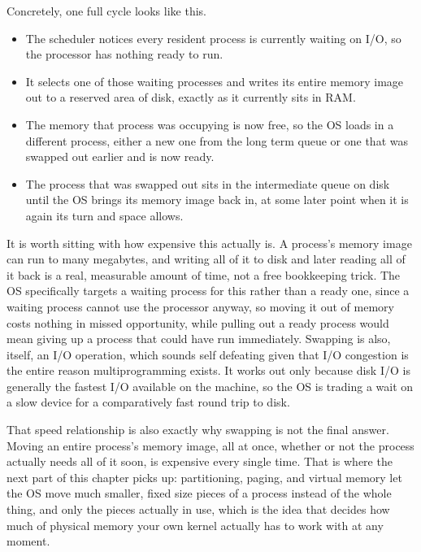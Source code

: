 \documentclass[11pt]{article}
\begin{document}
Concretely, one full cycle looks like this.

\begin{itemize}[leftmargin=1.4em]
  \item The scheduler notices every resident process is currently waiting on I/O, so the processor has nothing ready to run.
  \item It selects one of those waiting processes and writes its entire memory image out to a reserved area of disk, exactly as it currently sits in RAM.
  \item The memory that process was occupying is now free, so the OS loads in a different process, either a new one from the long term queue or one that was swapped out earlier and is now ready.
  \item The process that was swapped out sits in the intermediate queue on disk until the OS brings its memory image back in, at some later point when it is again its turn and space allows.
\end{itemize}

It is worth sitting with how expensive this actually is. A process's memory image can run to many megabytes, and writing all of it to disk and later reading all of it back is a real, measurable amount of time, not a free bookkeeping trick. The OS specifically targets a waiting process for this rather than a ready one, since a waiting process cannot use the processor anyway, so moving it out of memory costs nothing in missed opportunity, while pulling out a ready process would mean giving up a process that could have run immediately. Swapping is also, itself, an I/O operation, which sounds self defeating given that I/O congestion is the entire reason multiprogramming exists. It works out only because disk I/O is generally the fastest I/O available on the machine, so the OS is trading a wait on a slow device for a comparatively fast round trip to disk.

That speed relationship is also exactly why swapping is not the final answer. Moving an entire process's memory image, all at once, whether or not the process actually needs all of it soon, is expensive every single time. That is where the next part of this chapter picks up: partitioning, paging, and virtual memory let the OS move much smaller, fixed size pieces of a process instead of the whole thing, and only the pieces actually in use, which is the idea that decides how much of physical memory your own kernel actually has to work with at any moment.
\end{document}

